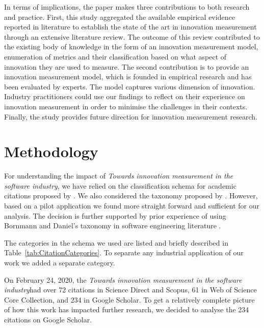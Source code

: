 \documentclass[sigplan]{acmart}
\newcommand{\theArticle}{\textit{Towards innovation measurement in the software industry}}
\begin{document}
In terms of implications, the paper makes three contributions to both research and practice. First, this study aggregated the available empirical evidence reported in literature to establish the state of the art in innovation measurement through an extensive literature review. The outcome of this review contributed to the existing body of knowledge in the form of an innovation measurement model, enumeration of metrics and their classification based on what aspect of innovation they are used to measure. The second contribution is to provide an innovation measurement model, which is founded in empirical research and has been evaluated by experts. The model captures various dimension of innovation. Industry practitioners could use our findings to reflect on their experience on innovation measurement in order to minimise the challenges in their contexts. Finally, the study provides future direction for innovation measurement research.



\section{Methodology}\label{sec:method} 
For understanding the impact of \theArticle, we have relied on the classification schema for academic citations proposed by \citet{teufel2006annotation}. We also considered the taxonomy proposed by \citet{bornmann2008citation}. However, based on a pilot application we found \citet{teufel2006annotation} more straight forward and sufficient for our analysis. The decision is further supported by prior experience of using Bornmann and Daniel's taxonomy in software engineering literature \cite{poulding2015using}.

The categories in the schema we used are listed and briefly described in Table~\ref{tab:CitationCategories}. To separate any industrial application of our work we added a separate category. 

On February 24, 2020, the \theArticle  had over 72 citations in Science Direct and Scopus, 61 in Web of Science Core Collection, and 234 in Google Scholar. To get a relatively complete picture of how this work has impacted further research, we decided to analyse the 234 citations on Google Scholar. 
\end{document}
